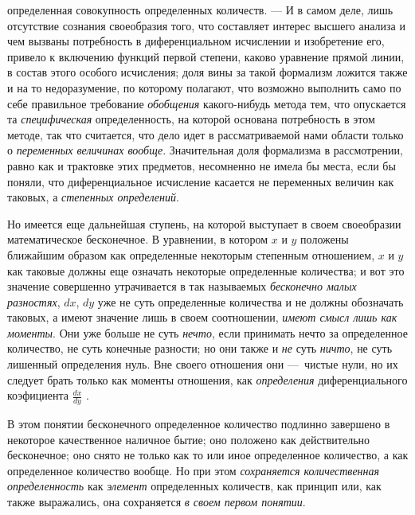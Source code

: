 {определенная совокупность определенных количеств. — И в самом деле, лишь
отсутствие сознания своеобразия того, что составляет интерес высшего
анализа и чем вызваны потребность в диференциальном исчислении и
изобретение его, привело к включению функций первой степени, каково
уравнение прямой линии, в состав этого особого исчисления; доля вины за
такой формализм ложится также и на то недоразумение, по которому полагают,
что возможно выполнить само по себе правильное требование
{\em обобщения} какого-нибудь метода тем, что
опускается та {\em специфическая} определенность, на
которой основана потребность в этом методе, так что считается, что дело
идет в рассматриваемой нами области только о
{\em переменных величинах вообще}. Значительная доля
формализма в рассмотрении, равно как и трактовке этих предметов, несомненно
не имела бы места, если бы поняли, что диференциальное исчисление касается
не переменных величин как таковых, а {\em степенных
определений}.

Но имеется еще дальнейшая ступень, на которой выступает в своем своеобразии
математическое бесконечное. В уравнении, в котором
$x$ и $y$ положены
ближайшим образом как определенные некоторым степенным отношением,
$x$ и $y$ как таковые
должны еще означать некоторые определенные количества; и вот это значение
совершенно утрачивается в так называемых
{\em бесконечно малых разностях},
$dx$, $dy$ уже не суть
определенные количества и не должны обозначать таковых, а имеют значение
лишь в своем соотношении, {\em имеют смысл лишь как
моменты}. Они уже больше не суть {\em нечто}, если
принимать нечто за определенное количество, не суть конечные разности; но
они также и {\em не} суть
{\em ничто}, не суть лишенный определения нуль. Вне
своего отношения они —~чистые нули, но их следует брать только как моменты
отношения, как {\em определения} диференциального
коэфициента  $\frac{\mathit{dx}}{\mathit{dy}}$ .

В этом понятии бесконечного определенное количество подлинно завершено в
некоторое качественное наличное бытие; оно положено как действительно
бесконечное; оно снято не только как то или иное определенное количество, а
как определенное количество вообще. Но при этом
{\em сохраняется количественная определенность} как
{\em элемент} определенных количеств, как принцип или,
как также выражались, она сохраняется {\em в своем
первом понятии}.

}
